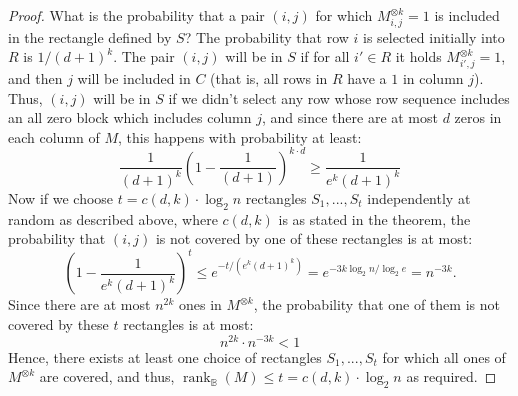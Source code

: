 \documentclass[10pt,a4paper]{amsart}
\newcommand{\Rbool}{{\rank}_\mathbb{B}}
\newcommand{\rank}{\mathop{\mathrm{rank}}}
\begin{document}
\begin{proof}
What is the probability that a pair $(i,j)$ for which $M^{\otimes k}_{i,j} = 1$ is included in the rectangle defined by $S$?
The probability that row $i$ is selected initially into $R$  is $1/(d+1)^k$.
The pair $(i,j)$ will be in $S$ if for all $i'\in R$ it holds $M^{\otimes k}_{i',j} = 1$, and then $j$ will be included in $C$ (that is, all rows in $R$ have a $1$ in column $j$).
Thus, $(i,j)$ will be in $S$ if we didn't select any row whose row sequence includes an all zero block which includes column $j$,
and since there are at most $d$ zeros in each column of $M$,  this happens with probability at least:
$$
\frac{1}{(d+1)^k}\left( 1 - \frac{1}{(d+1)}\right)^{k\cdot d} \geq \frac{1}{e^k (d+1)^k}
$$
Now if we choose $t =  c(d,k)\cdot \log_2 n  $ rectangles $S_1,...,S_{t}$ independently at random as described above, where $c(d,k)$ is as stated in the theorem,
the probability that $(i,j)$ is not covered by one of these rectangles is at most:
$$
\left(1- \frac{1}{e^k(d+1)^k} \right)^t \leq e^{-t/(e^k(d+1)^k)} = e^{-3k\log_2 n/\log_2 e } = n^{-3k}.
$$
Since there are at most $n^{2k}$ ones in $M^{\otimes k}$, the probability that one of them is not covered by these $t$ rectangles is at most:
$$n^{2k} \cdot n^{-3k} < 1$$
Hence, there exists at least one choice of rectangles $S_1,...,S_t$ for which all ones of $M^{\otimes k}$ are covered,
and thus, $\Rbool(M) \leq t = c(d,k) \cdot \log_2 n $ as required.
\end{proof}
\end{document}
